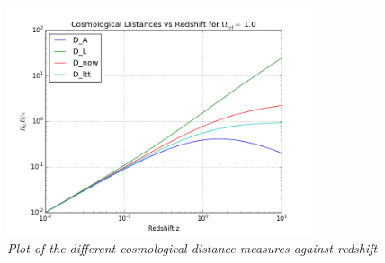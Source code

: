 \documentclass{literature}
\begin{document}
\begin{figure}[!htp]
\centering
\includegraphics[width=0.8\textwidth]{cosmo_dist.png}
\caption{\footnotesize{\emph{Plot of the different cosmological distance measures against redshift}}}
\label{fig:cosmo_dist}
\end{figure}
\end{document}
